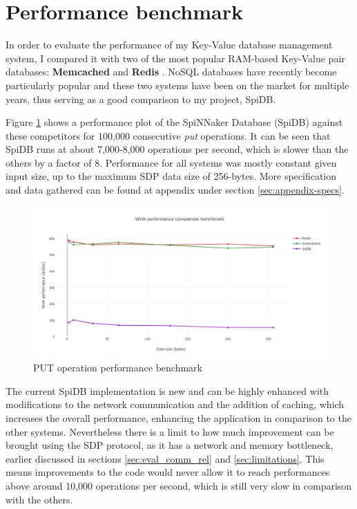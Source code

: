 

\section{Performance benchmark}
In order to evaluate the performance of my Key-Value database management system, I compared it with two of the most popular RAM-based Key-Value pair databases: \textbf{Memcached} \cite{memcached} and \textbf{Redis} \cite{redis}. NoSQL databases have recently become particularly popular \cite{nosqlsurvey} and these two systems have been on the market for multiple years, thus serving as a good comparison to my project, SpiDB.

Figure \ref{fig:write-perf-benchmark} shows a performance plot of the SpiNNaker Database (SpiDB) against these competitors for 100,000 consecutive \textit{put} operations. It can be seen that SpiDB runs at about 7,000-8,000 operations per second, which is slower than the others by a factor of 8. Performance for all systems was mostly constant given input size, up to the maximum SDP data size of 256-bytes. More specification and data gathered can be found at appendix under section \ref{sec:appendix-specs}.

\begin{figure}
\begin{center}
	\includegraphics[width=1.4\textwidth, natwidth=1063, natheight=509]{images/write_performance.png}
\end{center}
\caption{PUT operation performance benchmark}
\label{fig:write-perf-benchmark}
\end{figure}

The current SpiDB implementation is new and can be highly enhanced with modifications to the network communication and the addition of caching, which increases the overall performance, enhancing the application in comparison to the other systems. Nevertheless there is a limit to how much improvement can be brought using the SDP protocol, as it has a network and memory bottleneck, earlier discussed in sections \ref{sec:eval_comm_rel} and \ref{sec:limitations}. This means improvements to the code would never allow it to reach performances above around 10,000 operations per second, which is still very slow in comparison with the others.

